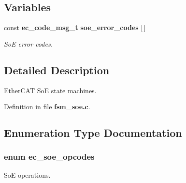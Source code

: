 \subsection*{Variables}
\begin{DoxyCompactItemize}
\item 
const {\bf ec\-\_\-code\-\_\-msg\-\_\-t} {\bf soe\-\_\-error\-\_\-codes} [$\,$]\label{fsm__soe_8c_a4013ee44d8165e19ed7abec334d499e4}

\begin{DoxyCompactList}\small\item\em So\-E error codes. \end{DoxyCompactList}\end{DoxyCompactItemize}


\subsection{Detailed Description}
Ether\-C\-A\-T So\-E state machines. 

Definition in file {\bf fsm\-\_\-soe.\-c}.



\subsection{Enumeration Type Documentation}
\subsubsection[{ec\-\_\-soe\-\_\-opcodes}]{\setlength{\rightskip}{0pt plus 5cm}enum {\bf ec\-\_\-soe\-\_\-opcodes}}\label{fsm__soe_8c_a9c7163e5550adaf891eb9afff86b72cd}


So\-E operations. 

